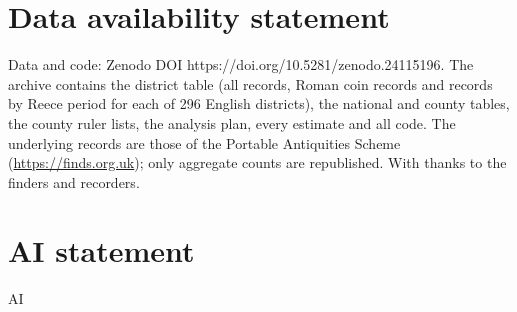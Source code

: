 \documentclass[11pt,a4paper]{article}
\begin{document}
\section*{Data availability statement}
Data and code: Zenodo DOI https://doi.org/10.5281/zenodo.24115196. The archive contains the district table (all records, Roman coin records and records by Reece period for each of 296 English districts), the national and county tables, the county ruler lists, the analysis plan, every estimate and all code. The underlying records are those of the Portable Antiquities Scheme (\url{https://finds.org.uk}); only aggregate counts are republished. With thanks to the finders and recorders.

\section*{AI statement}
{{AI}}
\end{document}
